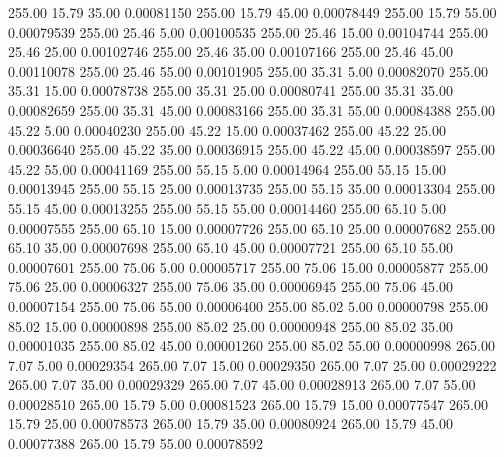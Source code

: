     255.00     15.79     35.00     0.00081150
    255.00     15.79     45.00     0.00078449
    255.00     15.79     55.00     0.00079539
    255.00     25.46      5.00     0.00100535
    255.00     25.46     15.00     0.00104744
    255.00     25.46     25.00     0.00102746
    255.00     25.46     35.00     0.00107166
    255.00     25.46     45.00     0.00110078
    255.00     25.46     55.00     0.00101905
    255.00     35.31      5.00     0.00082070
    255.00     35.31     15.00     0.00078738
    255.00     35.31     25.00     0.00080741
    255.00     35.31     35.00     0.00082659
    255.00     35.31     45.00     0.00083166
    255.00     35.31     55.00     0.00084388
    255.00     45.22      5.00     0.00040230
    255.00     45.22     15.00     0.00037462
    255.00     45.22     25.00     0.00036640
    255.00     45.22     35.00     0.00036915
    255.00     45.22     45.00     0.00038597
    255.00     45.22     55.00     0.00041169
    255.00     55.15      5.00     0.00014964
    255.00     55.15     15.00     0.00013945
    255.00     55.15     25.00     0.00013735
    255.00     55.15     35.00     0.00013304
    255.00     55.15     45.00     0.00013255
    255.00     55.15     55.00     0.00014460
    255.00     65.10      5.00     0.00007555
    255.00     65.10     15.00     0.00007726
    255.00     65.10     25.00     0.00007682
    255.00     65.10     35.00     0.00007698
    255.00     65.10     45.00     0.00007721
    255.00     65.10     55.00     0.00007601
    255.00     75.06      5.00     0.00005717
    255.00     75.06     15.00     0.00005877
    255.00     75.06     25.00     0.00006327
    255.00     75.06     35.00     0.00006945
    255.00     75.06     45.00     0.00007154
    255.00     75.06     55.00     0.00006400
    255.00     85.02      5.00     0.00000798
    255.00     85.02     15.00     0.00000898
    255.00     85.02     25.00     0.00000948
    255.00     85.02     35.00     0.00001035
    255.00     85.02     45.00     0.00001260
    255.00     85.02     55.00     0.00000998
    265.00      7.07      5.00     0.00029354
    265.00      7.07     15.00     0.00029350
    265.00      7.07     25.00     0.00029222
    265.00      7.07     35.00     0.00029329
    265.00      7.07     45.00     0.00028913
    265.00      7.07     55.00     0.00028510
    265.00     15.79      5.00     0.00081523
    265.00     15.79     15.00     0.00077547
    265.00     15.79     25.00     0.00078573
    265.00     15.79     35.00     0.00080924
    265.00     15.79     45.00     0.00077388
    265.00     15.79     55.00     0.00078592
